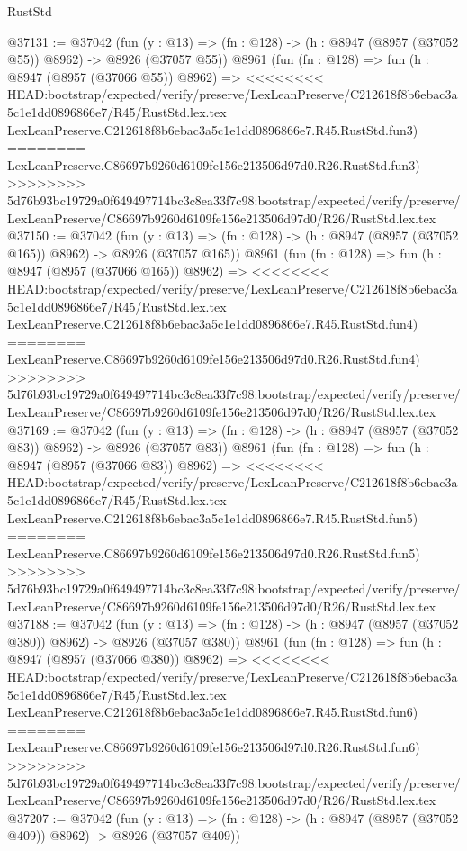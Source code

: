 \begin{lexlean}{RustStd}
\begin{coremodule}
{\begin{coremodule}
{{{{{{{{{{{{{{{{{{{{{{{{{{{{{{{{{{{{{{{@37131 := @37042
    (fun (y : @13) => (fn : @128) -> (h : @8947 (@8957 (@37052 @55)) @8962) -> @8926 (@37057 @55))
    @8961
    (fun (fn : @128) =>
    fun (h : @8947 (@8957 (@37066 @55)) @8962) =>
<<<<<<<< HEAD:bootstrap/expected/verify/preserve/LexLeanPreserve/C212618f8b6ebac3a5c1e1dd0896866e7/R45/RustStd.lex.tex
    LexLeanPreserve.C212618f8b6ebac3a5c1e1dd0896866e7.R45.RustStd.fun3)
========
    LexLeanPreserve.C86697b9260d6109fe156e213506d97d0.R26.RustStd.fun3)
>>>>>>>> 5d76b93bc19729a0f649497714bc3c8ea33f7c98:bootstrap/expected/verify/preserve/LexLeanPreserve/C86697b9260d6109fe156e213506d97d0/R26/RustStd.lex.tex
@37150 := @37042
    (fun (y : @13) => (fn : @128) -> (h : @8947 (@8957 (@37052 @165)) @8962) -> @8926 (@37057 @165))
    @8961
    (fun (fn : @128) =>
    fun (h : @8947 (@8957 (@37066 @165)) @8962) =>
<<<<<<<< HEAD:bootstrap/expected/verify/preserve/LexLeanPreserve/C212618f8b6ebac3a5c1e1dd0896866e7/R45/RustStd.lex.tex
    LexLeanPreserve.C212618f8b6ebac3a5c1e1dd0896866e7.R45.RustStd.fun4)
========
    LexLeanPreserve.C86697b9260d6109fe156e213506d97d0.R26.RustStd.fun4)
>>>>>>>> 5d76b93bc19729a0f649497714bc3c8ea33f7c98:bootstrap/expected/verify/preserve/LexLeanPreserve/C86697b9260d6109fe156e213506d97d0/R26/RustStd.lex.tex
@37169 := @37042
    (fun (y : @13) => (fn : @128) -> (h : @8947 (@8957 (@37052 @83)) @8962) -> @8926 (@37057 @83))
    @8961
    (fun (fn : @128) =>
    fun (h : @8947 (@8957 (@37066 @83)) @8962) =>
<<<<<<<< HEAD:bootstrap/expected/verify/preserve/LexLeanPreserve/C212618f8b6ebac3a5c1e1dd0896866e7/R45/RustStd.lex.tex
    LexLeanPreserve.C212618f8b6ebac3a5c1e1dd0896866e7.R45.RustStd.fun5)
========
    LexLeanPreserve.C86697b9260d6109fe156e213506d97d0.R26.RustStd.fun5)
>>>>>>>> 5d76b93bc19729a0f649497714bc3c8ea33f7c98:bootstrap/expected/verify/preserve/LexLeanPreserve/C86697b9260d6109fe156e213506d97d0/R26/RustStd.lex.tex
@37188 := @37042
    (fun (y : @13) => (fn : @128) -> (h : @8947 (@8957 (@37052 @380)) @8962) -> @8926 (@37057 @380))
    @8961
    (fun (fn : @128) =>
    fun (h : @8947 (@8957 (@37066 @380)) @8962) =>
<<<<<<<< HEAD:bootstrap/expected/verify/preserve/LexLeanPreserve/C212618f8b6ebac3a5c1e1dd0896866e7/R45/RustStd.lex.tex
    LexLeanPreserve.C212618f8b6ebac3a5c1e1dd0896866e7.R45.RustStd.fun6)
========
    LexLeanPreserve.C86697b9260d6109fe156e213506d97d0.R26.RustStd.fun6)
>>>>>>>> 5d76b93bc19729a0f649497714bc3c8ea33f7c98:bootstrap/expected/verify/preserve/LexLeanPreserve/C86697b9260d6109fe156e213506d97d0/R26/RustStd.lex.tex
@37207 := @37042
    (fun (y : @13) => (fn : @128) -> (h : @8947 (@8957 (@37052 @409)) @8962) -> @8926 (@37057 @409))
}}}}}}}}}}}}}}}}}}}}}}}}}}}}}}}}}}}}}}}
\end{coremodule}}
\end{coremodule}
\end{lexlean}
